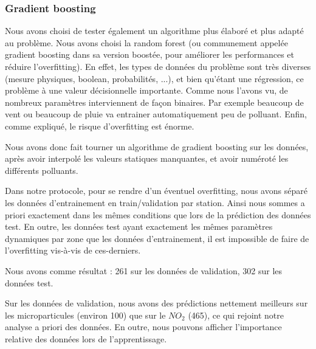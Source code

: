 \documentclass{beamer}
\begin{document}
\begin{frame}
\frametitle{Gradient boosting}


Nous avons choisi de tester également un algorithme plus élaboré et plus adapté au problème. Nous avons choisi la random forest (ou communement appelée gradient boosting dans sa version boostée, pour améliorer les performances et réduire l'overfitting). En effet, les types de données du problème sont très diverses (mesure physiques, boolean, probabilités, ...), et bien qu'étant une régression, ce problème à une valeur décisionnelle importante. Comme nous l'avons vu, de nombreux paramètres interviennent de façon binaires. Par exemple beaucoup de vent ou beaucoup de pluie va entrainer automatiquement peu de polluant. Enfin, comme expliqué, le risque d'overfitting est énorme.

Nous avons donc fait tourner un algorithme de gradient boosting sur les données, après avoir interpolé les valeurs statiques manquantes, et avoir numéroté les différents polluants.

Dans notre protocole, pour se rendre d'un éventuel overfitting, nous avons séparé les données d'entrainement en train/validation par station. Ainsi nous sommes a priori exactement dans les mêmes conditions que lors de la prédiction des données test. En outre, les données test ayant exactement les mêmes paramètres dynamiques par zone que les données d'entrainement, il est impossible de faire de l'overfitting vis-à-vis de ces-derniers.

Nous avons comme résultat : 261 sur les données de validation, 302 sur les données test.

Sur les données de validation, nous avons des prédictions nettement meilleurs sur les microparticules (environ 100) que sur le $NO_2$ (465), ce qui rejoint notre analyse a priori des données. En outre, nous pouvons afficher l'importance relative des données lors de l'apprentissage.


\end{frame}
\end{document}
